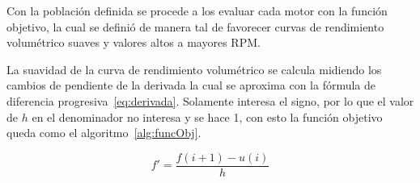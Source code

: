 




Con la población definida se procede a los evaluar cada motor con la función
objetivo, la cual se definió de manera tal de favorecer curvas de rendimiento
volumétrico suaves y valores altos a mayores RPM.\@

La suavidad de la curva de rendimiento volumétrico se calcula midiendo los
cambios de pendiente de la derivada la cual se aproxima con la fórmula de
diferencia progresiva~\ref{eq:derivada}.
%
Solamente interesa el signo, por lo que el valor de $h$ en el denominador no
interesa y se hace 1, con esto la función objetivo queda como el
algoritmo~\ref{alg:funcObj}.

\begin{equation}\label{eq:derivada}
  f' = \frac{f(i+1) - u(i)}{h}
\end{equation}

